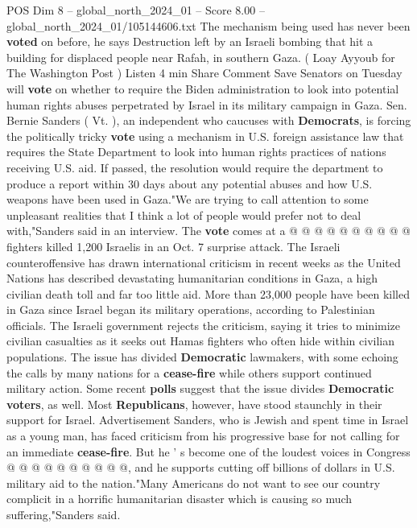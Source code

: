 \begin{textsample}{POS Dim 8 – global\_north\_2024\_01 – Score 8.00 – global\_north\_2024\_01/105144606.txt}  \label{ex:f8_pos_184}
The mechanism being used has never been \textbf{voted} on before, he says Destruction left by an Israeli bombing that hit a building for displaced people near Rafah, in southern Gaza. ( Loay Ayyoub for The Washington Post ) Listen 4 min Share Comment Save Senators on Tuesday will \textbf{vote} on whether to require the Biden administration to look into potential human rights abuses perpetrated by Israel in its military campaign in Gaza.
Sen.
Bernie Sanders ( Vt. ), an independent who caucuses with \textbf{Democrats}, is forcing the politically tricky \textbf{vote} using a mechanism in U.S. foreign assistance law that requires the State Department to look into human rights practices of nations receiving U.S. aid.
If passed, the resolution would require the department to produce a report within 30 days about any potential abuses and how U.S. weapons have been used in Gaza."We are trying to call attention to some unpleasant realities that I think a lot of people would prefer not to deal with,"Sanders said in an interview.
The \textbf{vote} comes at a @ @ @ @ @ @ @ @ @ @ fighters killed 1,200 Israelis in an Oct. 7 surprise attack.
The Israeli counteroffensive has drawn international criticism in recent weeks as the United Nations has described devastating humanitarian conditions in Gaza, a high civilian death toll and far too little aid.
More than 23,000 people have been killed in Gaza since Israel began its military operations, according to Palestinian officials.
The Israeli government rejects the criticism, saying it tries to minimize civilian casualties as it seeks out Hamas fighters who often hide within civilian populations.
The issue has divided \textbf{Democratic} lawmakers, with some echoing the calls by many nations for a \textbf{cease-fire} while others support continued military action.
Some recent \textbf{polls} suggest that the issue divides \textbf{Democratic} \textbf{voters}, as well.
Most \textbf{Republicans}, however, have stood staunchly in their support for Israel.
Advertisement Sanders, who is Jewish and spent time in Israel as a young man, has faced criticism from his progressive base for not calling for an immediate \textbf{cease-fire}.
But he ' s become one of the loudest voices in Congress @ @ @ @ @ @ @ @ @ @, and he supports cutting off billions of dollars in U.S. military aid to the nation."Many Americans do not want to see our country complicit in a horrific humanitarian disaster which is causing so much suffering,"Sanders said.

\end{textsample}
